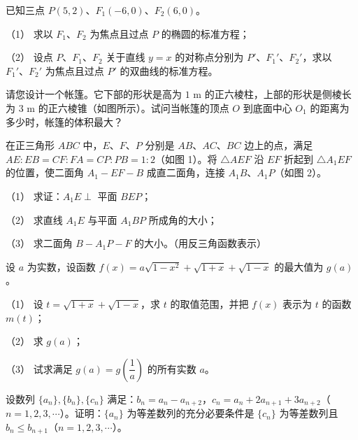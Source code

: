 \begin{question}
已知三点 $P(5,2)\text{、}F_1(-6,0)\text{、}F_2(6,0)$。

（1） 求以 $F_1\text{、}F_2$ 为焦点且过点 $P$ 的椭圆的标准方程；

（2） 设点 $P\text{、}F_1\text{、}F_2$ 关于直线 $y=x$ 的对称点分别为 $P'\text{、}F_1'\text{、}F_2'$，求以 $F_1'\text{、}F_2'$ 为焦点且过点 $P'$ 的双曲线的标准方程。

\Needspace{0.4\textheight}
\end{question}
\begin{question}
请您设计一个帐篷。它下部的形状是高为 $1\text{ m}$ 的正六棱柱，上部的形状是侧棱长为 $3\text{ m}$ 的正六棱锥（如图所示）。试问当帐篷的顶点 $O$ 到底面中心 $O_1$ 的距离为多少时，帐篷的体积最大？
\nopagebreak[4]
\begin{center}\end{center}
\nopagebreak[4]
\Needspace{0.4\textheight}
\end{question}
\begin{question}
在正三角形 $ABC$ 中，$E\text{、}F\text{、}P$ 分别是 $AB\text{、}AC\text{、}BC$ 边上的点，满足 $AE:EB=CF:FA=CP:PB=1:2$（如图 1）。将 $\triangle AEF$ 沿 $EF$ 折起到 $\triangle A_1EF$ 的位置，使二面角 $A_1-EF-B$ 成直二面角，连接 $A_1B\text{、}A_1P$（如图 2）。

（1） 求证：$A_1E\perp$ 平面 $BEP$；

（2） 求直线 $A_1E$ 与平面 $A_1BP$ 所成角的大小；

（3） 求二面角 $B-A_1P-F$ 的大小。（用反三角函数表示）
\nopagebreak[4]
\begin{center}\end{center}
\nopagebreak[4]
\end{question}
\begin{question}
设 $a$ 为实数，设函数 $f(x)=a\sqrt{1-x^2}+\sqrt{1+x}+\sqrt{1-x}$ 的最大值为 $g(a)$。

（1） 设 $t=\sqrt{1+x}+\sqrt{1-x}$，求 $t$ 的取值范围，并把 $f(x)$ 表示为 $t$ 的函数 $m(t)$；

（2） 求 $g(a)$；

（3） 试求满足 $g(a)=g\left(\dfrac1a\right)$ 的所有实数 $a$。

\end{question}
\begingroup
\renewenvironment{question}{\Needspace{0.05\textheight}}{}
\begin{question}
设数列 $\{a_n\},\{b_n\},\{c_n\}$ 满足：$b_n=a_n-a_{n+2}$，$c_n=a_n+2a_{n+1}+3a_{n+2}$（$n=1,2,3,\cdots$）。证明：$\{a_n\}$ 为等差数列的充分必要条件是 $\{c_n\}$ 为等差数列且 $b_n\leqslant b_{n+1}$（$n=1,2,3,\cdots$）。


\end{question}
\endgroup